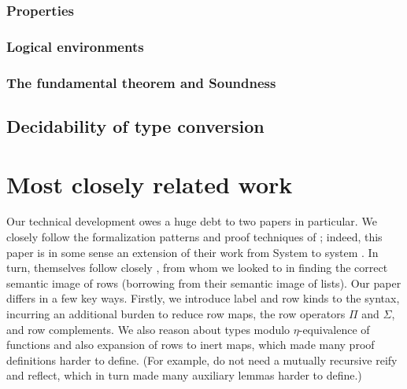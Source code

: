 \documentclass[sigplan,10pt,review]{acmart}\settopmatter{printfolios=true,printccs=false,printacmref=false}
\begin{document}
\subsubsection{Properties}

\subsubsection{Logical environments}

\subsubsection{The fundamental theorem and Soundness}
\subsection{Decidability of type conversion}

\section{Most closely related work}

Our technical development owes a huge debt to two papers in particular. We closely follow the formalization patterns and proof techniques of \citet{ChapmanKNW19}; indeed, this paper is in some sense an extension of their work from System \Fome to system \Rome. In turn, \citet{ChapmanKNW19} themselves follow closely \citet{AllaisBM13}, from whom we looked to in finding the correct semantic image of rows (borrowing from their semantic image of lists). Our paper differs in a few key ways. Firstly, we introduce label and row kinds to the syntax, incurring an additional burden to reduce row maps, the row operators $\Pi$ and $\Sigma$, and row complements. We also reason about types modulo $\eta$-equivalence of functions and also expansion of rows to inert maps, which made many proof definitions harder to define. (For example, \citet{ChapmanKNW19} do not need a mutually recursive reify and reflect, which in turn made many auxiliary lemmas harder to define.)



\end{document}
